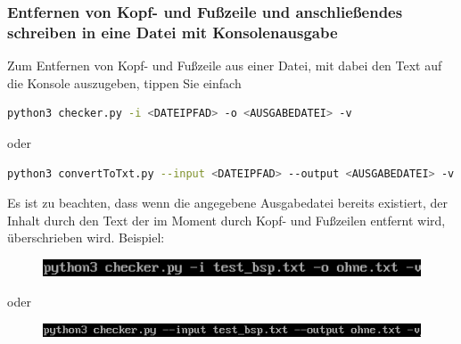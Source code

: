 \documentclass[12pt]{scrartcl}
\begin{document}
\subsubsection{Entfernen von Kopf- und Fußzeile und anschließendes schreiben in eine Datei mit Konsolenausgabe}
\label{sec:first-steps-extraction-file-with}
Zum Entfernen von Kopf- und Fußzeile aus einer Datei, mit dabei den Text auf die Konsole auszugeben, tippen Sie einfach
\begin{lstlisting}[language=bash]
python3 checker.py -i <DATEIPFAD> -o <AUSGABEDATEI> -v
\end{lstlisting}
\begin{center}
oder
\end{center}
\begin{lstlisting}[language=bash] 
python3 convertToTxt.py --input <DATEIPFAD> --output <AUSGABEDATEI> -v
\end{lstlisting}
Es ist zu beachten, dass wenn die angegebene Ausgabedatei bereits existiert, der Inhalt durch den Text der im Moment durch Kopf- und Fußzeilen entfernt wird, überschrieben wird. 
Beispiel:
\begin{figure}[htbp]
\includegraphics[width=1.0\textwidth]{ersteSchritteKopfFussIntoFileWithConsole001}\par\vspace{0.25cm}
\label{fig:ersteSchritteKopfFussIntoFileWithConsole001}
\end{figure}
\begin{center}
oder
\end{center}
\begin{figure}[htbp]
\includegraphics[width=1.0\textwidth]{ersteSchritteKopfFussIntoFileWithConsole002}\par

\vspace{0.25cm}
\label{fig:ersteSchritteKopfFussIntoFileWithConsole002}
\end{figure}
\begin{figure}[htbp]
\centering
\end{figure}
\newpage
\end{document}
